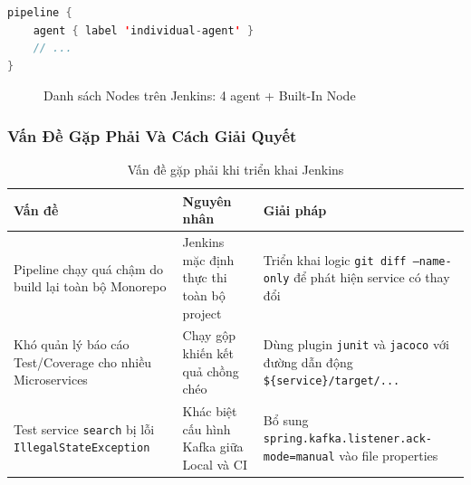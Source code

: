 \begin{lstlisting}[language=Java, caption={Cấu hình agent label trong Jenkinsfile}]
pipeline {
    agent { label 'individual-agent' }
    // ...
}
\end{lstlisting}

\begin{figure}[H]
\centering
{}
\caption{Danh sách Nodes trên Jenkins: 4 agent + Built-In Node}
\end{figure}

\subsubsection{Vấn Đề Gặp Phải Và Cách Giải Quyết}

\begin{table}[H]
\centering
\caption{Vấn đề gặp phải khi triển khai Jenkins}
\begin{tabular}{|p{4.5cm}|p{4.5cm}|p{4.5cm}|}
\hline
\textbf{Vấn đề} & \textbf{Nguyên nhân} & \textbf{Giải pháp} \\
\hline
Pipeline chạy quá chậm do build lại toàn bộ Monorepo & Jenkins mặc định thực thi toàn bộ project & Triển khai logic \texttt{git diff --name-only} để phát hiện service có thay đổi \\
\hline
Khó quản lý báo cáo Test/Coverage cho nhiều Microservices & Chạy gộp khiến kết quả chồng chéo & Dùng plugin \texttt{junit} và \texttt{jacoco} với đường dẫn động \texttt{\$\{service\}/target/...} \\
\hline
Test service \texttt{search} bị lỗi \texttt{IllegalStateException} & Khác biệt cấu hình Kafka giữa Local và CI & Bổ sung \texttt{spring.kafka.listener.ack-mode=manual} vào file properties \\
\hline
\end{tabular}
\end{table}
